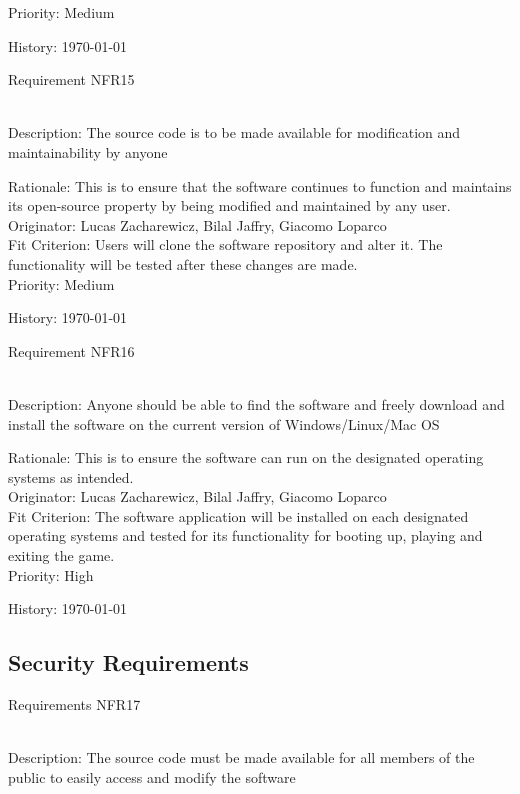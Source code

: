 \documentclass[12pt, titlepage]{article}
\begin{document}
\begin{enumerate}
{\color{blue}Priority: Medium}
  
{\color{blue}History: \today}

{\color{blue}\item Requirement NFR15} \\
{\color{blue}Description: } The source code is to be made available for modification and maintainability by anyone

{\color{blue}Rationale: This is to ensure that the software continues to function and maintains its open-source property by being modified and maintained by any user.}\\

{\color{blue}Originator:  Lucas Zacharewicz, Bilal Jaffry, Giacomo Loparco}\\

{\color{blue}Fit Criterion: Users will clone the software repository and alter it. The functionality will be tested after these changes are made.}\\
 
{\color{blue}Priority: Medium}
  
{\color{blue}History: \today}

{\color{blue}\item Requirement NFR16} \\
{\color{blue} Description:} Anyone should be able to find the software and freely download and install the software on the current version of Windows/Linux/{\color{blue}Mac OS}

{\color{blue}Rationale: This is to ensure the software can run on the designated operating systems as intended.}\\

{\color{blue}Originator:  Lucas Zacharewicz, Bilal Jaffry, Giacomo Loparco}\\

{\color{blue}Fit Criterion: The software application will be installed on each designated operating systems and tested for its functionality for booting up, playing and exiting the game.}\\
 
{\color{blue}Priority: High}
  
{\color{blue}History: \today}
\newpage
\subsection{Security Requirements}

{\color{blue}\item Requirements NFR17}\\
{\color{blue} Description: } The source code must be made available for all members of the public to easily access and modify the software


\end{enumerate}
\end{document}
